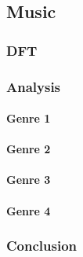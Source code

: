 \subsection{Music}
\subsubsection{DFT}

\subsubsection{Analysis}

\paragraph{Genre 1}

\paragraph{Genre 2}

\paragraph{Genre 3}

\paragraph{Genre 4}

\subsubsection{Conclusion}


